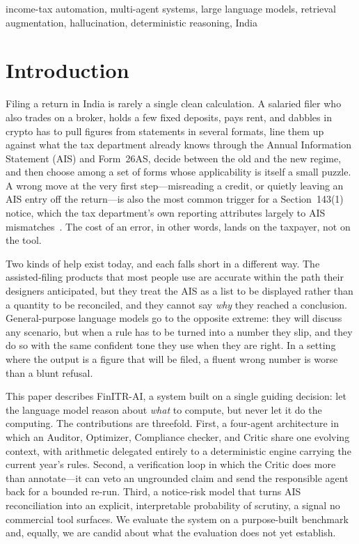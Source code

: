 \documentclass[conference]{IEEEtran}
\begin{document}
\begin{IEEEkeywords}
income-tax automation, multi-agent systems, large language models, retrieval
augmentation, hallucination, deterministic reasoning, India
\end{IEEEkeywords}

\section{Introduction}
Filing a return in India is rarely a single clean calculation. A salaried filer
who also trades on a broker, holds a few fixed deposits, pays rent, and dabbles
in crypto has to pull figures from statements in several formats, line them up
against what the tax department already knows through the Annual Information
Statement (AIS) and Form~26AS, decide between the old and the new regime, and
then choose among a set of forms whose applicability is itself a small puzzle.
A wrong move at the very first step---misreading a credit, or quietly leaving an
AIS entry off the return---is also the most common trigger for a Section~143(1)
notice, which the tax department's own reporting attributes largely to AIS
mismatches~\cite{ref_cbdt}. The cost of an error, in other words, lands on the
taxpayer, not on the tool.

Two kinds of help exist today, and each falls short in a different way. The
assisted-filing products that most people use are accurate within the path their
designers anticipated, but they treat the AIS as a list to be displayed rather
than a quantity to be reconciled, and they cannot say \emph{why} they reached a
conclusion. General-purpose language models go to the opposite extreme: they will
discuss any scenario, but when a rule has to be turned into a number they slip,
and they do so with the same confident tone they use when they are right. In a
setting where the output is a figure that will be filed, a fluent wrong number is
worse than a blunt refusal.

This paper describes FinITR-AI, a system built on a single guiding decision:
let the language model reason about \emph{what} to compute, but never let it do
the computing. The contributions are threefold. First, a four-agent architecture
in which an Auditor, Optimizer, Compliance checker, and Critic share one evolving
context, with arithmetic delegated entirely to a deterministic engine carrying
the current year's rules. Second, a verification loop in which the Critic does
more than annotate---it can veto an ungrounded claim and send the responsible
agent back for a bounded re-run. Third, a notice-risk model that turns AIS
reconciliation into an explicit, interpretable probability of scrutiny, a signal
no commercial tool surfaces. We evaluate the system on a purpose-built benchmark
and, equally, we are candid about what the evaluation does not yet establish.
\end{document}
